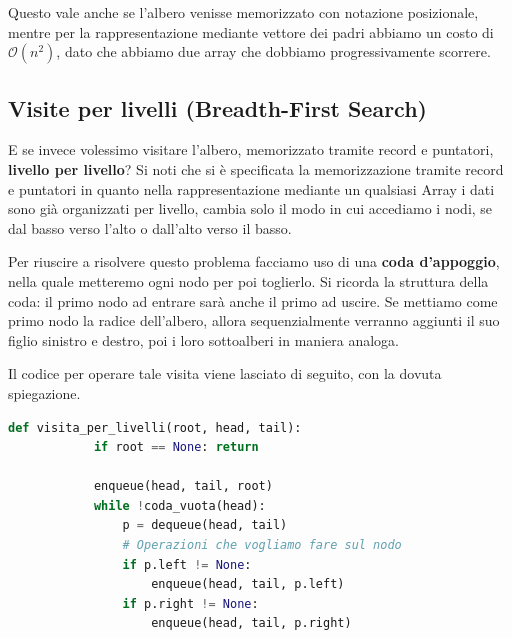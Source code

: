 \documentclass[12pt]{report}
\begin{document}
	Questo vale anche se l'albero venisse memorizzato con notazione posizionale, mentre per la rappresentazione mediante vettore dei padri abbiamo un costo di $\mathcal{O}(n^2)$, dato che abbiamo due array che dobbiamo progressivamente scorrere.
	
	\subsection{Visite per livelli (Breadth-First Search)}
	E se invece volessimo visitare l'albero, memorizzato tramite record e puntatori, \textbf{livello per livello}? Si noti che si è specificata la memorizzazione tramite record e puntatori in quanto nella rappresentazione mediante un qualsiasi Array i dati sono già organizzati per livello, cambia solo il modo in cui accediamo i nodi, se dal basso verso l'alto o dall'alto verso il basso.
	
	Per riuscire a risolvere questo problema facciamo uso di una \textbf{coda d'appoggio}, nella quale metteremo ogni nodo per poi toglierlo. Si ricorda la struttura della coda: il primo nodo ad entrare sarà anche il primo ad uscire. Se mettiamo come primo nodo la radice dell'albero, allora sequenzialmente verranno aggiunti il suo figlio sinistro e destro, poi i loro sottoalberi in maniera analoga.
	
	Il codice per operare tale visita viene lasciato di seguito, con la dovuta spiegazione.
	
	\begin{lstlisting}[language=Python, caption={Algoritmo di visita per livelli tramite Coda}]
		def visita_per_livelli(root, head, tail):
			if root == None: return
			
			enqueue(head, tail, root)
			while !coda_vuota(head):
				p = dequeue(head, tail)
				# Operazioni che vogliamo fare sul nodo
				if p.left != None:
					enqueue(head, tail, p.left)
				if p.right != None:
					enqueue(head, tail, p.right)
	\end{lstlisting}
	
\end{document}
